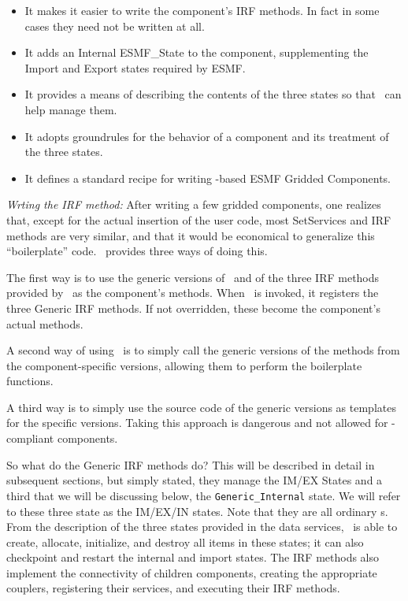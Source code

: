 \begin{itemize} 

\item It makes it easier to write the component's IRF methods. In fact
in some cases they need not be written at all.

\item It adds an Internal ESMF\_State to the component, supplementing the 
Import and Export states required by ESMF.

\item It provides a means of describing the contents of the three states
   so that \ggn\  can help manage them.

\item It adopts groundrules for the behavior of a component 
and its treatment of the three states.

\item It defines a standard recipe for writing 
 \ggn -based ESMF Gridded Components.

\end{itemize} 


{\em Wrting the IRF method:} 
After writing a few gridded components, one realizes that, except for
the actual insertion of the user code, most SetServices and IRF
methods are very similar, and that it would be economical to
generalize this ``boilerplate'' code. \ggn\   provides
three ways of doing this.

The first way is to use the generic versions of 
\ssv\  and of the three IRF methods provided by \ggn\  as the 
component's methods. When \gssv\  is
invoked, it registers the three Generic IRF methods. If not overridden,
these become the component's actual methods.

A second way of using \ggn\  is to simply call the generic
versions of the methods from the component-specific versions, allowing
them to perform the boilerplate functions. 

A third way is to simply use the source code
of the generic versions as templates for the specific versions.
Taking this approach is dangerous and not allowed for \ggn-compliant components. 

So what do the Generic IRF methods do? This will be described in detail
in subsequent sections, but simply stated, they manage the
IM/EX States and a third \stt that we will be discussing
below, the {\tt Generic\_Internal} state. We will refer to these three
state as the IM/EX/IN states. Note that they are all ordinary \stt s.
From the description of the three states provided in the data
services, \ggn\  is able to create, allocate, initialize,
and destroy all items in these states; it can also checkpoint and
restart the internal and import states. The IRF methods also implement the
connectivity of children components, creating the appropriate
couplers, registering their services, and executing their IRF methods.


